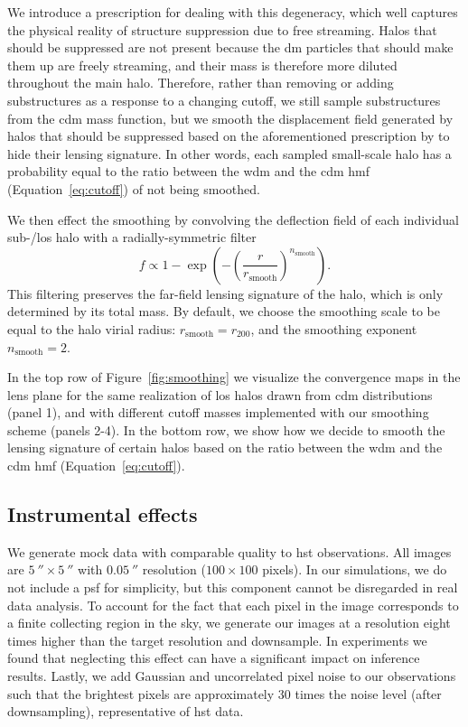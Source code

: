 We introduce a prescription for dealing with this degeneracy, which well captures the physical reality of structure suppression due to free streaming. 
Halos that should be suppressed are not present because the \gls*{dm} particles that should make them up are freely streaming, and their mass is therefore more diluted throughout the main halo.
Therefore, rather than removing or adding substructures as a response to a changing cutoff, we still sample substructures from the \gls*{cdm} mass function, but we smooth the displacement field generated by halos that should be suppressed based on the aforementioned prescription by \cite{Lovell:2020bcy} to hide their lensing signature. In other words, each sampled small-scale halo has a probability equal to the ratio between the \gls*{wdm} and the \gls*{cdm} \gls*{hmf} (Equation~\eqref{eq:cutoff}) of not being smoothed. 

We then effect the smoothing by convolving the deflection field of each individual sub-/\gls*{los} halo with a radially-symmetric filter
\begin{equation}
f \propto 1 - \exp\left(-\left(\frac{r}{r_{\mathrm{smooth}}}\right)^{n_{\mathrm{smooth}}}\right).
\end{equation}
This filtering preserves the far-field lensing signature of the halo, which is only determined by its total mass.
By default, we choose the smoothing scale to be equal to the halo virial radius: $r_\mathrm{smooth}=r_{200}$, and the smoothing exponent $n_\mathrm{smooth}=2$.

In the top row of Figure~\ref{fig:smoothing} we visualize the convergence maps in the lens plane for the same realization of \gls*{los} halos drawn from \gls*{cdm} distributions (panel 1), and with different cutoff masses implemented with our smoothing scheme (panels 2-4). In the bottom row, we show how we decide to smooth the lensing signature of certain halos based on the ratio between the \gls*{wdm} and the \gls*{cdm} \gls*{hmf} (Equation~\eqref{eq:cutoff}). 


\subsection{Instrumental effects}

We generate mock data with comparable quality to \gls*{hst} observations. All images are $\SI{5}{\arcsecond} \times \SI{5}{\arcsecond}$ with $\SI{0.05}{\arcsecond}$ resolution ($100 \times 100$ pixels). In our simulations, we do not include a \gls*{psf} for simplicity, but this component cannot be disregarded in real data analysis. To account for the fact that each pixel in the image corresponds to a finite collecting region in the sky, we generate our images at a resolution eight times higher than the target resolution and downsample. In experiments we found that neglecting this effect can have a significant impact on inference results. Lastly, we add Gaussian and uncorrelated pixel noise to our observations such that the brightest pixels are approximately 30 times the noise level (after downsampling), representative of \gls*{hst} data.



